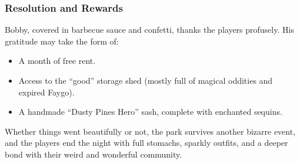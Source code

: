 \subsubsection{Resolution and Rewards}

Bobby, covered in barbecue sauce and confetti, thanks the players profusely. His gratitude may take the form of:
\begin{itemize}
    \item A month of free rent.
    \item Access to the “good” storage shed (mostly full of magical oddities and expired Faygo).
    \item A handmade “Dusty Pines Hero” sash, complete with enchanted sequins.
\end{itemize}

Whether things went beautifully or not, the park survives another bizarre event, and the players end the night with full stomachs, sparkly outfits, and a deeper bond with their weird and wonderful community.





